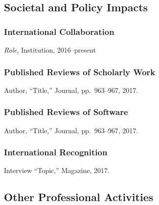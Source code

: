     \subsection{Societal and Policy Impacts}
    \label{subsec:societalimpact}

        \subsubsection{International Collaboration}
        \label{subsec:collab}
            \begin{subnum}
                \item  {\mark \textit{Role}, Institution, 2016--present}
            \end{subnum}

        \subsubsection{Published Reviews of Scholarly Work}
        \label{subsec:bookreviews}
            \begin{subnum}
                \item   Author, ``Title,'' Journal, pp.~963--967, 2017.
            \end{subnum}

        \subsubsection{Published Reviews of Software}
        \label{subsec:softwarereviews}
            \begin{subnum}
                \item   Author, ``Title,'' Journal, pp.~963--967, 2017.
            \end{subnum}

        \subsubsection{International Recognition}
        \label{subsec:recognition}
            \begin{subnum}
                \item   \mark Interview ``Topic,'' Magazine, 2017.
            \end{subnum}

\subsection{Other Professional Activities}
\label{subsec:profactivities}

